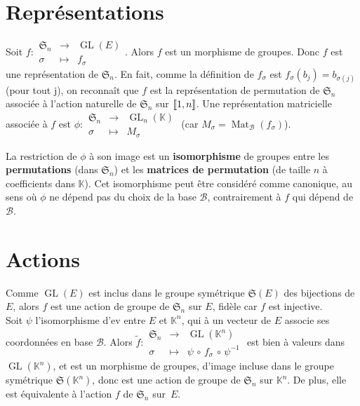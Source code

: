 \documentclass[10pt,a4paper,french,landscape]{article}
\DeclarePairedDelimiter\bracketlong{\llbracket}{\rrbracket}
\newcommand{\br}[1]{\bracketlong*{#1}}
\theoremstyle{definition}
\theoremstyle{remark}
\DeclareMathOperator{\GL}{GL}
\DeclareMathOperator{\M}{Mat}
\newcommand{\KK}{\mathbb K}
\newcommand{\Sy}{\mathfrak{S}}
\newcommand{\1}{\mathbbm{1}}
\newcommand{\Sn}[1][n]{\Sy_{#1}}
\newcommand{\ba}[1]{\mathcal{#1}}
\begin{document}
\begin{multicols*}{2}
\section{Représentations}
\label{sec:repr}

Soit $f\colon
 \begin{array}{ccc}
    \Sn & \longrightarrow & \GL(E) \\
    \sigma & \longmapsto & f_{\sigma}
 \end{array}$. Alors $f$ est un morphisme de groupes.
Donc $f$ est une représentation de $\Sn$. En fait, comme la définition de $f_\sigma$ est $f_\sigma(b_j) = b_{\sigma(j)}$ (pour tout j), on reconnaît que $f$ est la représentation de permutation de $\Sn$ associée à l'action naturelle de $\Sn$ sur $\br{1,n}$.
Une représentation matricielle associée à $f$ est\quad
$\phi\colon
 \begin{array}{ccc}
    \Sn & \longrightarrow & \GL_n(\KK) \\
    \sigma & \longmapsto & M_\sigma
 \end{array}
$ (car $M_\sigma = \M_\ba{B}(f_{\sigma})$).\bigskip

La restriction de $\phi$ à son image est un \textbf{isomorphisme} de groupes entre les \textbf{permutations} (dans $\Sn$) et les \textbf{matrices de permutation} (de taille $n$ à coefficients dans $\KK$). Cet isomorphisme peut être considéré comme canonique, au sens où $\phi$ ne dépend pas du choix de la base $\ba{B}$, contrairement à $f$ qui dépend de $\ba{B}$.

\section{Actions}

Comme $\GL(E)$ est inclus dans le groupe symétrique $\Sy(E)$ des bijections de $E$, alors $f$ est une action de groupe de $\Sn$ sur $E$, fidèle car $f$ est 
injective.\\

Soit 
$ \psi $ 
l'isomorphisme d'ev entre $E$ et $\KK^n$, qui à un vecteur
 de $E$ associe ses coordonnées en base $\ba{B}$. Alors $\tilde{f}\colon
 \begin{array}{ccc}
    \Sn & \longrightarrow & \GL(\KK^n) \\
    \sigma & \longmapsto & \psi\, \circ\,  f_\sigma\, \circ\, \psi^{-1}
 \end{array}
$ est bien à valeurs dans $\GL(\KK^n)$, et est un morphisme de groupes, d'image incluse dans le groupe symétrique $\Sy(\KK^n)$, donc est une action de groupe de $\Sn$ sur $\KK^n$. De plus, elle est équivalente à l'action $f$ de $\Sn$ sur~$E$.\\


\end{multicols*}
\end{document}
